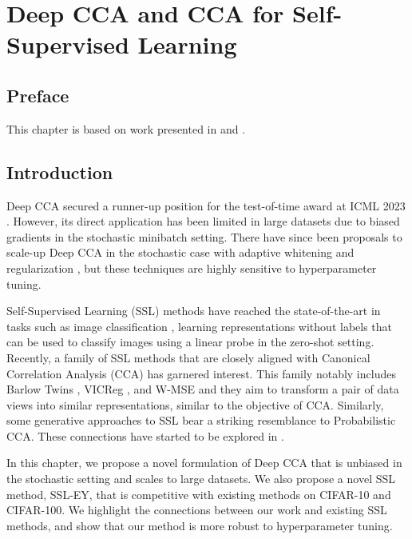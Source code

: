 \graphicspath{{chapters/deep_learning/}}


\chapter{Deep CCA and CCA for Self-Supervised Learning}\label{chap:deep_learning}
\minitoc
\section*{Preface}

This chapter is based on work presented in \citet{chapman2023cca} and \citet{chapman2023efficient}.

\section{Introduction}

Deep CCA \citep{andrew2013deep} secured a runner-up position for the test-of-time award at ICML 2023 \citep{ICML2023TOT}.
However, its direct application has been limited in large datasets due to biased gradients in the stochastic minibatch setting.
There have since been proposals to scale-up Deep CCA in the stochastic case with adaptive whitening \cite{wang2015stochastic} and regularization \cite{chang2018scalable}, but these techniques are highly sensitive to hyperparameter tuning.

Self-Supervised Learning (SSL) methods have reached the state-of-the-art in tasks such as image classification \citep{balestriero2023cookbook}, learning representations without labels that can be used to classify images using a linear probe in the zero-shot setting.
Recently, a family of SSL methods that are closely aligned with Canonical Correlation Analysis (CCA) has garnered interest.
This family notably includes Barlow Twins \citep{zbontar2021barlow}, VICReg \citep{bardes2021vicreg}, and W-MSE \citep{ermolov2021whitening} and they aim to transform a pair of data views into similar representations, similar to the objective of CCA. Similarly, some generative approaches to SSL\cite{sansone2022gedi} bear a striking resemblance to Probabilistic CCA\cite{bach2005probabilistic}.
These connections have started to be explored in \cite{balestriero2022contrastive}.

In this chapter, we propose a novel formulation of Deep CCA that is unbiased in the stochastic setting and scales to large datasets.
We also propose a novel SSL method, SSL-EY, that is competitive with existing methods on CIFAR-10 and CIFAR-100.
We highlight the connections between our work and existing SSL methods, and show that our method is more robust to hyperparameter tuning.

